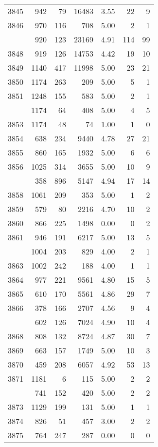 \documentclass[
]{article}
\begin{document}
\begin{table}
\begin{tabular}[t]{lrrrrrr}
3845 & 942 & 79 & 16483 & 3.55 & 22 & 9\\
3846 & 970 & 116 & 708 & 5.00 & 2 & 1\\
\addlinespace
3847 & 920 & 123 & 23169 & 4.91 & 114 & 99\\
3848 & 919 & 126 & 14753 & 4.42 & 19 & 10\\
3849 & 1140 & 417 & 11998 & 5.00 & 23 & 21\\
3850 & 1174 & 263 & 209 & 5.00 & 5 & 1\\
3851 & 1248 & 155 & 583 & 5.00 & 2 & 1\\
\addlinespace
3852 & 1174 & 64 & 408 & 5.00 & 4 & 5\\
3853 & 1174 & 48 & 74 & 1.00 & 1 & 0\\
3854 & 638 & 234 & 9440 & 4.78 & 27 & 21\\
3855 & 860 & 165 & 1932 & 5.00 & 6 & 6\\
3856 & 1025 & 314 & 3655 & 5.00 & 10 & 9\\
\addlinespace
3857 & 358 & 896 & 5147 & 4.94 & 17 & 14\\
3858 & 1061 & 209 & 353 & 5.00 & 1 & 2\\
3859 & 579 & 80 & 2216 & 4.70 & 10 & 2\\
3860 & 866 & 225 & 1498 & 0.00 & 0 & 2\\
3861 & 946 & 191 & 6217 & 5.00 & 13 & 5\\
\addlinespace
3862 & 1004 & 203 & 829 & 4.00 & 2 & 1\\
3863 & 1002 & 242 & 188 & 4.00 & 1 & 1\\
3864 & 977 & 221 & 9561 & 4.80 & 15 & 5\\
3865 & 610 & 170 & 5561 & 4.86 & 29 & 7\\
3866 & 378 & 166 & 2707 & 4.56 & 9 & 4\\
\addlinespace
3867 & 602 & 126 & 7024 & 4.90 & 10 & 4\\
3868 & 808 & 132 & 8724 & 4.87 & 30 & 7\\
3869 & 663 & 157 & 1749 & 5.00 & 10 & 3\\
3870 & 459 & 208 & 6057 & 4.92 & 53 & 13\\
3871 & 1181 & 6 & 115 & 5.00 & 2 & 2\\
\addlinespace
3872 & 741 & 152 & 420 & 5.00 & 2 & 2\\
3873 & 1129 & 199 & 131 & 5.00 & 1 & 1\\
3874 & 826 & 51 & 457 & 3.00 & 2 & 2\\
3875 & 764 & 247 & 287 & 0.00 & 0 & 0\\

\end{tabular}
\end{table}
\end{document}
